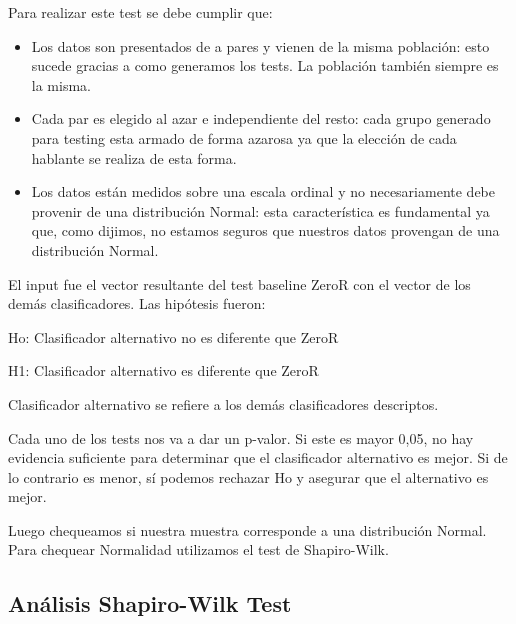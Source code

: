 Para realizar este test se debe cumplir que:

\begin{itemize}
    \item Los datos son presentados de a pares y vienen de la misma población: esto sucede gracias a como generamos los tests. La población también siempre es la misma.
    \item Cada par es elegido al azar e independiente del resto: cada grupo generado para testing esta armado de forma azarosa ya que la elección de cada hablante se realiza de esta forma.
    \item Los datos están medidos sobre una escala ordinal y no necesariamente debe provenir de una distribución Normal: esta característica es fundamental ya que, como dijimos, no estamos seguros que nuestros datos provengan de una distribución Normal.
\end{itemize}

El input fue el vector resultante del test baseline ZeroR con el vector de los demás clasificadores. Las hipótesis fueron:

\vspace{0.5cm}
\hspace{2cm}Ho: Clasificador alternativo no es diferente que ZeroR
\vspace{0.25cm}

\hspace{2cm}H1: Clasificador alternativo es diferente que ZeroR
\vspace{0.5cm}

Clasificador alternativo se refiere a los demás clasificadores descriptos. 

Cada uno de los tests nos va a dar un p-valor. Si este es mayor 0,05, no hay evidencia suficiente para determinar que el clasificador alternativo es mejor. Si de lo contrario es menor, sí podemos rechazar Ho y asegurar que el alternativo es mejor. 

Luego chequeamos si nuestra muestra corresponde a una distribución Normal. Para chequear Normalidad utilizamos el test de Shapiro-Wilk.

\subsection{Análisis Shapiro-Wilk Test}

